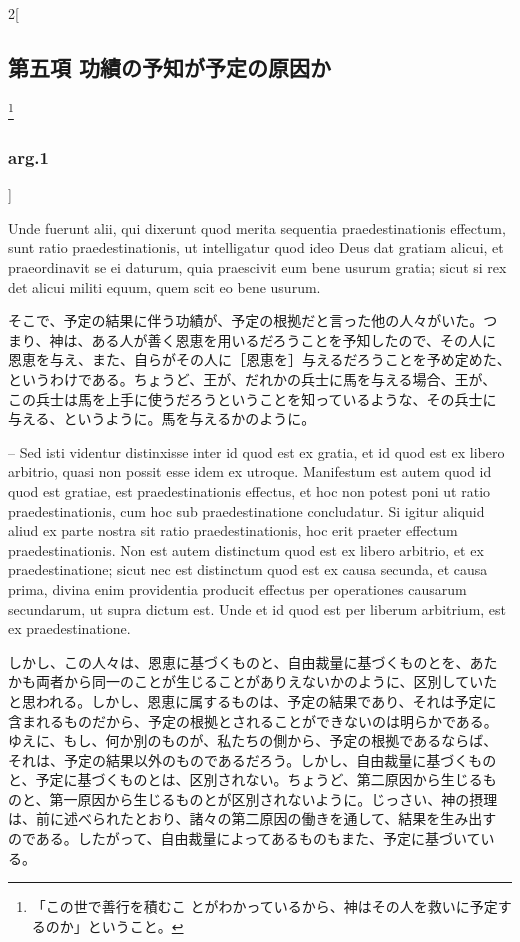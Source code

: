 \documentclass[paper=a4paper,fontsize=10pt,jafontsize=9pt,titlepage]{jlreq}
\begin{document}
\begin{paracol}{2}[\subsection{第五項 功績の予知が予定の原因か}\footnote{「この世で善行を積むこ とがわかっているから、神はその人を救いに予定するのか」ということ。}\subsubsection{arg.1}]
\switchcolumn*


Unde
fuerunt alii, qui dixerunt quod merita sequentia praedestinationis
effectum, sunt ratio praedestinationis, ut intelligatur quod ideo Deus
dat gratiam alicui, et praeordinavit se ei daturum, quia praescivit eum
bene usurum gratia; sicut si rex det alicui militi equum, quem scit eo
bene usurum.


\switchcolumn


そこで、予定の結果に伴う功績が、予定の根拠だと言った他の人々がいた。つ
まり、神は、ある人が善く恩恵を用いるだろうことを予知したので、その人に
恩恵を与え、また、自らがその人に［恩恵を］与えるだろうことを予め定めた、
というわけである。ちょうど、王が、だれかの兵士に馬を与える場合、王が、
この兵士は馬を上手に使うだろうということを知っているような、その兵士に
与える、というように。馬を与えるかのように。


\switchcolumn*


-- Sed isti videntur distinxisse inter id quod est ex gratia,
et id quod est ex libero arbitrio, quasi non possit esse idem ex
utroque. Manifestum est autem quod id quod est gratiae, est
praedestinationis effectus, et hoc non potest poni ut ratio
praedestinationis, cum hoc sub praedestinatione concludatur. Si igitur
aliquid aliud ex parte nostra sit ratio praedestinationis, hoc erit
praeter effectum praedestinationis. Non est autem distinctum quod est ex
libero arbitrio, et ex praedestinatione; sicut nec est distinctum quod
est ex causa secunda, et causa prima, divina enim providentia producit
effectus per operationes causarum secundarum, ut supra dictum est. Unde
et id quod est per liberum arbitrium, est ex praedestinatione.


\switchcolumn


しかし、この人々は、恩恵に基づくものと、自由裁量に基づくものとを、あた
かも両者から同一のことが生じることがありえないかのように、区別していた
と思われる。しかし、恩恵に属するものは、予定の結果であり、それは予定に
含まれるものだから、予定の根拠とされることができないのは明らかである。
ゆえに、もし、何か別のものが、私たちの側から、予定の根拠であるならば、
それは、予定の結果以外のものであるだろう。しかし、自由裁量に基づくもの
と、予定に基づくものとは、区別されない。ちょうど、第二原因から生じるも
のと、第一原因から生じるものとが区別されないように。じっさい、神の摂理
は、前に述べられたとおり、諸々の第二原因の働きを通して、結果を生み出す
のである。したがって、自由裁量によってあるものもまた、予定に基づいてい
る。


\switchcolumn*



\end{paracol}
\end{document}
